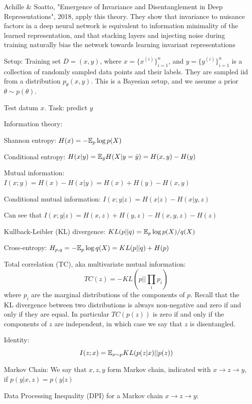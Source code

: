 \documentclass[english]{article}
\begin{document}
\item Achille \& Soatto, "Emergence of Invariance and Disentanglement in Deep Representations", 2018, apply this theory. They show that invariance to nuisance factors in a deep neural network is equivalent to information minimality of the learned representation, and that stacking layers and injecting noise during training naturally bias the network towards learning invariant representations

\item Setup: Training set $D = (x,y)$, where $x = \{x^{(i)}\}_{i=1}^n$, and $y = \{y^{(i)}\}_{i=1}^n$ is a collection of randomly sampled data points and their labels. They are sampled iid from a distribution $p_\theta(x,y)$. This is a Bayesian setup, and we assume a prior $\theta\sim p(\theta)$.

Test datum $x$. Task: predict $y$

\item Information theory: 

\benum 
\item Shannon entropy: $H(x)= -\mathbb{E}_p \log p(X)$
\item Conditional entropy: $H(x|y)= \mathbb{E}_{\bar y} H(X|y=\bar y) = H(x,y)-H(y)$
\item Mutual information: $I(x;y) = H(x)- H(x|y)  = H(x)+H(y)-H(x,y)$
\item Conditional mutual information: $I(x;y|z)=H(x|z)-H(x|y,z)$

Can see that $I(x;y|z) = H(x,z)+H(y,z)-H(x,y,z)- H(z)$

\item Kullback-Leibler (KL) divergence: $KL(p||q)=\mathbb{E}_p \log p(X)/q(X)$
\item Cross-entropy: $H_{p,q}=-\mathbb{E}_p \log q(X) = KL(p||q)+H(p)$
\item Total correlation (TC), aka multivariate mutual information: 
$$TC(z)=-KL(p || \prod_i p_i)$$ 
where $p_i$  are the marginal distributions of the components of $p$.  Recall that the KL divergence between two distributions is always non-negative and zero if and only if they are equal. In particular $TC(p(z))$ is zero if and only if the components of $z$ are independent, in which case we say that $z$ is disentangled.
\item Identity: 
$$I(z;x)= \mathbb{E}_{x\sim p} KL(p(z|x)||p(z))$$

\item Markov Chain: We say that $x,z,y$ form Markov chain, indicated with $x \to z \to y$, if $p(y|x,z) = p(y|z)$
\item Data Processing Inequality (DPI) for a Markov chain $x \to z \to y$:
\end{document}
